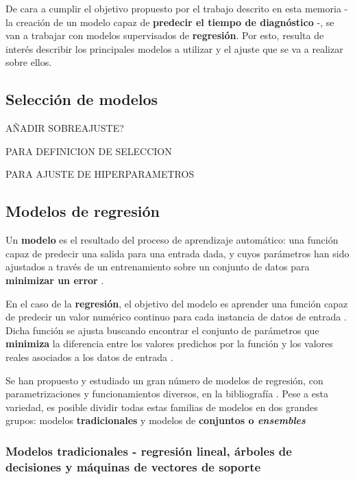 De cara a cumplir el objetivo propuesto por el trabajo descrito en esta memoria - la creación de un modelo capaz de \textbf{predecir el tiempo de diagnóstico} -, se van a trabajar con modelos supervisados de \textbf{regresión}. Por esto, resulta de interés describir los principales modelos a utilizar y el ajuste que se va a realizar sobre ellos.

\subsection{Selección de modelos}

AÑADIR SOBREAJUSTE? \cite{aima}

\cite{mlprobabilistic} PARA DEFINICION DE SELECCION

\cite{Goodfellow-et-al-2016} PARA AJUSTE DE HIPERPARAMETROS

\subsection{Modelos de regresión}

Un \textbf{modelo} es el resultado del proceso de aprendizaje automático: una función capaz de predecir una salida para una entrada dada, y cuyos parámetros han sido ajustados a través de un entrenamiento sobre un conjunto de datos para \textbf{minimizar un error} \cite{Burkov2019TheHM}. 

En el caso de la \textbf{regresión}, el objetivo del modelo es aprender una función capaz de predecir un valor numérico continuo para cada instancia de datos de entrada \cite{mlprobabilistic}. Dicha función se ajusta buscando encontrar el conjunto de parámetros que \textbf{minimiza} la diferencia entre los valores predichos por la función y los valores reales asociados a los datos de entrada \cite{Burkov2019TheHM}.

Se han propuesto y estudiado un gran número de modelos de regresión, con parametrizaciones y funcionamientos diversos, en la bibliografía \cite{tai2021surveyregressionalgorithmsconnections}. Pese a esta variedad, es posible dividir todas estas familias de modelos en dos grandes grupos: modelos \textbf{tradicionales} y modelos de \textbf{conjuntos o \textit{ensembles}} \cite{aima}

\subsubsection{Modelos tradicionales - regresión lineal, árboles de decisiones y máquinas de vectores de soporte}

